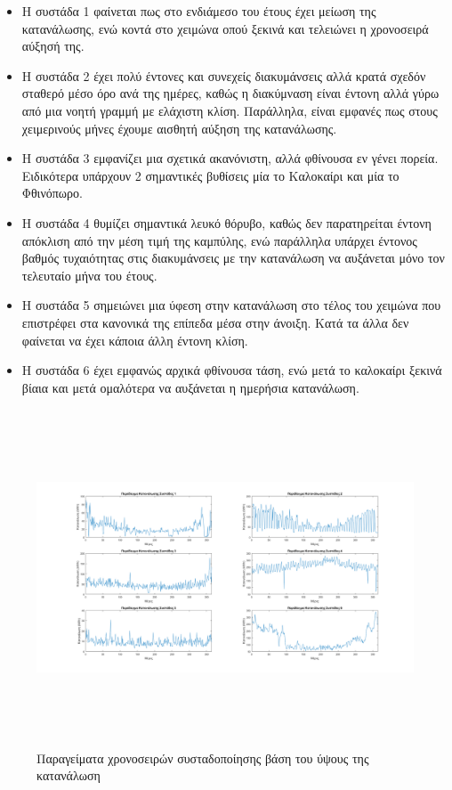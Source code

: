\begin{itemize}
\item Η συστάδα 1 φαίνεται πως στο ενδιάμεσο του έτους έχει μείωση της κατανάλωσης, ενώ κοντά στο χειμώνα οπού ξεκινά και τελειώνει η χρονοσειρά αύξησή της. 
\item Η συστάδα 2 έχει πολύ έντονες και συνεχείς διακυμάνσεις αλλά κρατά σχεδόν σταθερό μέσο όρο ανά της ημέρες, καθώς η διακύμναση είναι έντονη αλλά γύρω από μια νοητή γραμμή με ελάχιστη κλίση. Παράλληλα, είναι εμφανές πως στους χειμερινούς μήνες έχουμε αισθητή αύξηση της κατανάλωσης.
\item Η συστάδα 3 εμφανίζει μια σχετικά ακανόνιστη, αλλά φθίνουσα εν γένει πορεία. Ειδικότερα υπάρχουν 2 σημαντικές βυθίσεις μία το Καλοκαίρι και μία το Φθινόπωρο. 
\item Η συστάδα 4 θυμίζει σημαντικά λευκό θόρυβο, καθώς δεν παρατηρείται έντονη απόκλιση από την μέση τιμή της καμπύλης, ενώ παράλληλα υπάρχει έντονος βαθμός τυχαιότητας στις διακυμάνσεις με την κατανάλωση να αυξάνεται μόνο τον τελευταίο μήνα του έτους.
\item Η συστάδα 5 σημειώνει μια ύφεση στην κατανάλωση στο τέλος του χειμώνα που επιστρέφει στα κανονικά της επίπεδα μέσα στην άνοιξη. Κατά τα άλλα δεν φαίνεται να έχει κάποια άλλη έντονη κλίση.
\item Η συστάδα 6 έχει εμφανώς αρχικά φθίνουσα τάση, ενώ μετά το καλοκαίρι ξεκινά βίαια και μετά ομαλότερα να αυξάνεται η ημερήσια κατανάλωση.
\end{itemize}
\begin{figure}[ht!]
\centering
\includegraphics[width=180mm, height=100mm]{../../plots/Consumption_Analysis/gr_cluster_cons_level.png}
\caption{Παραγείματα χρονοσειρών συσταδοποίησης βάση του ύψους της κατανάλωση}
\label{fig:clusterform}
\end{figure}
